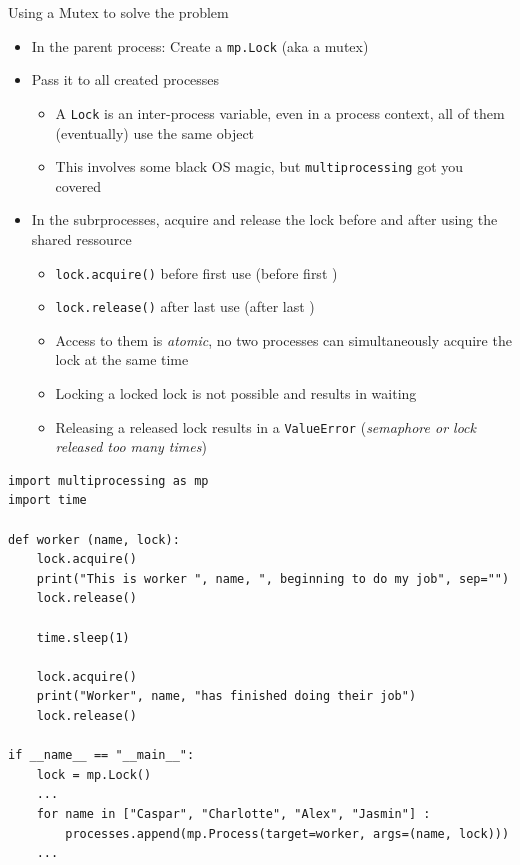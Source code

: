 \begin{frame}[fragile]{Using a Mutex to solve the problem}
%
\begin{itemize}
\item In the parent process: Create a \texttt{mp.Lock} (aka a mutex)
\item Pass it to all created processes
	\begin{itemize}
	\item A \texttt{Lock} is an inter-process variable, \ie even in a process context, all of them (eventually) use the same object
	\item This involves some black OS magic, but \texttt{multiprocessing} got you covered
	\end{itemize}
\item In the subrprocesses, acquire and release the lock before and after using the shared ressource
	\begin{itemize}
	\item \texttt{lock.acquire()} before first use (\zB before first )
	\item \texttt{lock.release()} after last use (\zB after last )
	\item Access to them is \emph{atomic}, \ie no two processes can simultaneously acquire the lock at the same time
	\item Locking a locked lock is not possible and results in waiting
	\item Releasing a released lock results in a \texttt{ValueError} (\emph{semaphore or lock released too many times})
	\end{itemize}
\end{itemize}
%
\end{frame}


\begin{frame}[fragile]
%
\begin{codebox}
\begin{verbatim}
import multiprocessing as mp
import time

def worker (name, lock):
    lock.acquire()
    print("This is worker ", name, ", beginning to do my job", sep="")
    lock.release()
    
    time.sleep(1)
    
    lock.acquire()
    print("Worker", name, "has finished doing their job")
    lock.release()

if __name__ == "__main__":
    lock = mp.Lock()
    ...
    for name in ["Caspar", "Charlotte", "Alex", "Jasmin"] :
        processes.append(mp.Process(target=worker, args=(name, lock)))
    ...
\end{verbatim}
\end{codebox}
%
\end{frame}

